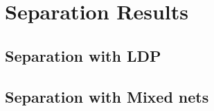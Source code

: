 \section{Separation Results}
\subsection{Separation with LDP}
\subsection{Separation with Mixed nets}